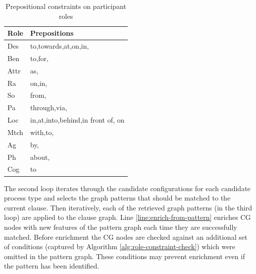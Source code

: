     \begin{table}[!ht]
    	\centering
    	\begin{tabular}{|l|l|}
    		\hline
    		\textbf{Role} & \textbf{Prepositions}             \\ \hline
    		Des           & to,towards,at,on,in,              \\ \hline
    		Ben           & to,for,                           \\ \hline
    		Attr          & as,                               \\ \hline
    		Ra            & on,in,                            \\ \hline
    		So            & from,                             \\ \hline
    		Pa            & through,via,                      \\ \hline
    		Loc           & in,at,into,behind,in front of, on \\ \hline
    		Mtch          & with,to,                          \\ \hline
    		Ag            & by,                               \\ \hline
    		Ph            & about,                            \\ \hline
    		Cog           & to                                \\ \hline
    	\end{tabular}
    	\caption{Prepositional constraints on participant roles }
    	\label{tab:participant-roles-constraints}
    \end{table}

    The second loop iterates through the candidate configurations for each candidate process type and selects the graph patterns that should be matched to the current clause. Then iteratively, each of the retrieved graph patterns (in the third loop) are applied to the clause graph. Line \ref{line:enrich-from-pattern} enriches CG nodes with new features of the pattern graph each time they are successfully matched. Before enrichment the CG nodes are checked against an additional set of conditions (captured by Algorithm \ref{alg:role-constraint-check}) which were omitted in the pattern graph. These conditions may prevent enrichment even if the pattern has been identified. 


